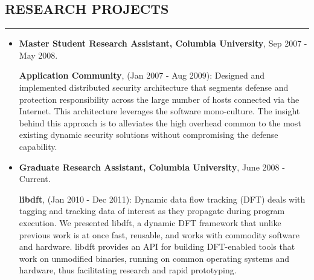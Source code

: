 \documentclass[10pt,a4]{article}
\begin{document}
\begin{small}
\begin{itemize}
\end{itemize}

\subsection*{RESEARCH PROJECTS}
\hrule
\vspace{0.2cm}
\begin{itemize}
\item {\bf Master Student Research Assistant, Columbia University}, Sep 2007 - May 2008.

  {\bf Application Community}, (Jan 2007 - Aug 2009): Designed and implemented
  distributed security architecture that segments defense and protection
  responsibility across the large number of hosts connected via the Internet.
  This architecture leverages the software mono-culture. The insight behind
  this approach is to alleviates the high overhead common to the most existing
  dynamic security solutions without compromising the defense capability.

\vspace{0.1cm}
\item  {\bf Graduate Research Assistant, Columbia University}, June 2008 - Current.

%

  {\bf libdft}, (Jan 2010 - Dec 2011): Dynamic data flow tracking (DFT) deals
  with tagging and tracking data of interest as they propagate during program
  execution.  We presented libdft, a dynamic DFT framework that unlike previous
  work is at once fast, reusable, and works with commodity software and
  hardware. libdft provides an API for building DFT-enabled tools that work on
  unmodified binaries, running on common operating systems and hardware, thus
  facilitating research and rapid prototyping.\\


\end{itemize}
\end{small}
\end{document}

